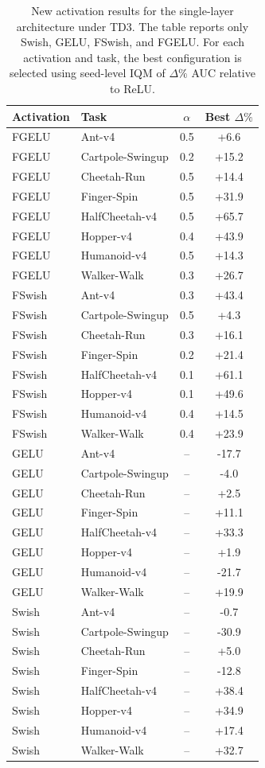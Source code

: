 \begin{table}[t]
\centering
\small
\setlength{\tabcolsep}{4pt}
\renewcommand{\arraystretch}{1.12}
\caption{New activation results for the single-layer architecture under TD3. The table reports only Swish, GELU, FSwish, and FGELU. For each activation and task, the best configuration is selected using seed-level IQM of $\Delta\%$ AUC relative to ReLU.}
\label{tab:new-results-td3-1layer}
\begin{tabular}{llcc}
\toprule
Activation & Task & $\alpha$ & Best $\Delta\%$ \\
\midrule
FGELU & Ant-v4 & 0.5 & +6.6 \\
FGELU & Cartpole-Swingup & 0.2 & +15.2 \\
FGELU & Cheetah-Run & 0.5 & +14.4 \\
FGELU & Finger-Spin & 0.5 & +31.9 \\
FGELU & HalfCheetah-v4 & 0.5 & +65.7 \\
FGELU & Hopper-v4 & 0.4 & +43.9 \\
FGELU & Humanoid-v4 & 0.5 & +14.3 \\
FGELU & Walker-Walk & 0.3 & +26.7 \\
FSwish & Ant-v4 & 0.3 & +43.4 \\
FSwish & Cartpole-Swingup & 0.5 & +4.3 \\
FSwish & Cheetah-Run & 0.3 & +16.1 \\
FSwish & Finger-Spin & 0.2 & +21.4 \\
FSwish & HalfCheetah-v4 & 0.1 & +61.1 \\
FSwish & Hopper-v4 & 0.1 & +49.6 \\
FSwish & Humanoid-v4 & 0.4 & +14.5 \\
FSwish & Walker-Walk & 0.4 & +23.9 \\
GELU & Ant-v4 & -- & -17.7 \\
GELU & Cartpole-Swingup & -- & -4.0 \\
GELU & Cheetah-Run & -- & +2.5 \\
GELU & Finger-Spin & -- & +11.1 \\
GELU & HalfCheetah-v4 & -- & +33.3 \\
GELU & Hopper-v4 & -- & +1.9 \\
GELU & Humanoid-v4 & -- & -21.7 \\
GELU & Walker-Walk & -- & +19.9 \\
Swish & Ant-v4 & -- & -0.7 \\
Swish & Cartpole-Swingup & -- & -30.9 \\
Swish & Cheetah-Run & -- & +5.0 \\
Swish & Finger-Spin & -- & -12.8 \\
Swish & HalfCheetah-v4 & -- & +38.4 \\
Swish & Hopper-v4 & -- & +34.9 \\
Swish & Humanoid-v4 & -- & +17.4 \\
Swish & Walker-Walk & -- & +32.7 \\
\bottomrule
\end{tabular}
\end{table}
